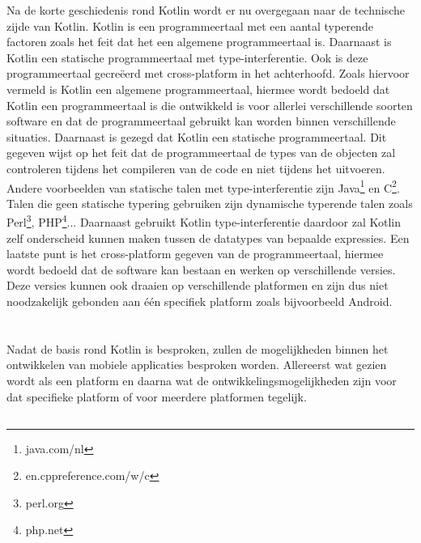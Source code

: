 Na de korte geschiedenis rond Kotlin wordt er nu overgegaan naar de technische zijde van Kotlin. Kotlin is een programmeertaal met een aantal typerende factoren zoals het feit dat het een algemene programmeertaal is. Daarnaast is Kotlin een statische programmeertaal met type-interferentie. Ook is deze programmeertaal gecreëerd met cross-platform in het achterhoofd.\autocite{Oliveira2020} Zoals hiervoor vermeld is Kotlin een algemene programmeertaal, hiermee wordt bedoeld dat Kotlin een programmeertaal is die ontwikkeld is voor allerlei verschillende soorten software en dat de programmeertaal gebruikt kan worden binnen verschillende situaties.\autocite{Skeen2018} Daarnaast is gezegd dat Kotlin een statische programmeertaal. Dit gegeven wijst op het feit dat de programmeertaal de types van de objecten zal controleren tijdens het compileren van de code en niet tijdens het uitvoeren. Andere voorbeelden van statische talen met type-interferentie zijn Java\footnote{java.com/nl} en C\footnote{en.cppreference.com/w/c}. Talen die geen statische typering gebruiken zijn dynamische typerende talen zoals Perl\footnote{perl.org}, PHP\footnote{php.net}... Daarnaast gebruikt Kotlin type-interferentie daardoor zal Kotlin zelf onderscheid kunnen maken tussen de datatypes van bepaalde expressies.\autocite{Meijer2004} Een laatste punt is het cross-platform gegeven van de programmeertaal, hiermee wordt bedoeld dat de software kan bestaan en werken op verschillende versies. Deze versies kunnen ook draaien op verschillende platformen en zijn dus niet noodzakelijk gebonden aan één specifiek platform zoals bijvoorbeeld Android.\autocite{Bishop2006}



\section{}
\label{sec:SVZplatformen-ontwikkelingsvormen}


Nadat de basis rond Kotlin is besproken, zullen de mogelijkheden binnen het ontwikkelen van mobiele applicaties besproken worden. Allereerst wat gezien wordt als een platform en daarna wat de ontwikkelingsmogelijkheden zijn voor dat specifieke platform of voor meerdere platformen tegelijk.

\subsection{}
\label{sec:SVZplatform}

